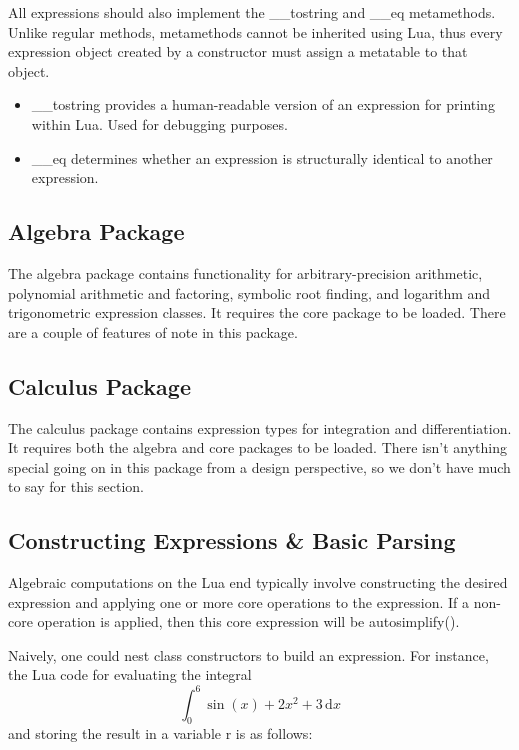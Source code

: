\documentclass{article}
\begin{document}
All expressions should also implement the {\ttfamily \_\_tostring} and {\ttfamily \_\_eq} metamethods. Unlike regular methods, metamethods cannot be inherited using Lua, thus every expression object created by a constructor must assign a metatable to that object.

\begin{itemize}
    \item {\ttfamily \_\_tostring} provides a human-readable version of an expression for printing within Lua. Used for debugging purposes.
    
    \item {\ttfamily \_\_eq} determines whether an expression is structurally identical to another expression.
\end{itemize}

\subsection{Algebra Package}

The algebra package contains functionality for arbitrary-precision arithmetic, polynomial arithmetic and factoring, symbolic root finding, and logarithm and trigonometric expression classes. It requires the core package to be loaded. There are a couple of features of note in this package.

\subsection{Calculus Package}

The calculus package contains expression types for integration and differentiation. It requires both the algebra and core packages to be loaded. There isn't anything special going on in this package from a design perspective, so we don't have much to say for this section.

\subsection{Constructing Expressions \& Basic Parsing}

Algebraic computations on the Lua end typically involve constructing the desired expression and applying one or more core operations to the expression. If a non-core operation is applied, then this core expression will be {\ttfamily autosimplify()}.

Naively, one could nest class constructors to build an expression. For instance, the Lua code for evaluating the integral \[ \int_0^6 \sin(x) + 2x^2 + 3 \hspace{2pt}\mathrm{d}x\] and storing the result in a variable {\ttfamily r} is as follows:
\end{document}

